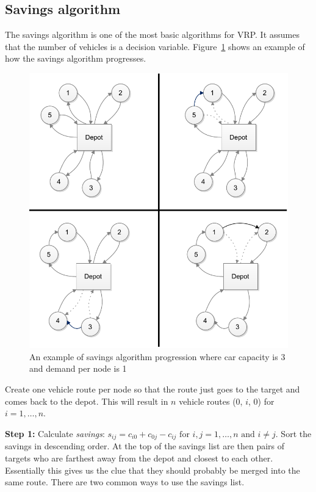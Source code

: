 \subsection{Savings algorithm}

The savings algorithm is one of the most basic algorithms for VRP. It assumes that the number of vehicles is a decision variable. Figure~\ref{fig:savings1} shows an example of how the savings algorithm progresses.

\begin{figure}[h]
  \begin{center}
    \includegraphics{images/Savings1.pdf}
    \caption{An example of savings algorithm progression where car capacity is 3 and demand per node is 1}
    \label{fig:savings1}
  \end{center}
\end{figure}

\bigskip
\noindent
Create one vehicle route per node so that the route just goes to the target and comes back to the depot. This will result in $n$ vehicle routes (0, $i$, 0) for $i = 1, \ldots, n$. \cite{reimann2004d}

\medskip
\noindent
\textbf{Step 1:} Calculate \textit{savings}: $s_{ij} = c_{i0} + c_{0j} - c_{ij} \text{ for } i, j = 1, \ldots, n \text{ and } i \neq j$. Sort the savings in descending order. \cite{reimann2004d} At the top of the savings list are then pairs of targets who are farthest away from the depot and closest to each other. Essentially this gives us the clue that they should probably be merged into the same route. There are two common ways to use the savings list.


